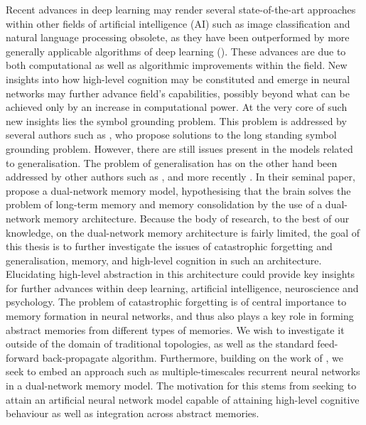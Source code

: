 Recent advances in deep learning may render several state-of-the-art approaches within other fields of artificial intelligence (AI) such as image classification and natural language processing obsolete, as they have been outperformed by more generally applicable algorithms of deep learning (\cite{LeCun2015, Schmidhuber2014}). These advances are due to both computational as well as algorithmic improvements within the field. New insights into how high-level cognition may be constituted and emerge in neural networks may further advance field's capabilities, possibly beyond what can be achieved only by an increase in computational power. At the very core of such new insights lies the symbol grounding problem. This problem is addressed by several authors such as \cite{Yamashita2008, Tani2014}, who propose solutions to the long standing symbol grounding problem. However, there are still issues present in the models related to generalisation. The problem of generalisation has on the other hand been addressed by other authors such as \cite{McClelland1995}, and more recently \cite{Hattori2014}. In their seminal paper, \cite{McClelland1995} propose a dual-network memory model, hypothesising that the brain solves the problem of long-term memory and memory consolidation by the use of a dual-network memory architecture. Because the body of research, to the best of our knowledge, on the dual-network memory architecture is fairly limited, the goal of this thesis is to further investigate the issues of catastrophic forgetting and generalisation, memory, and high-level cognition in such an architecture. Elucidating high-level abstraction in this architecture could provide key insights for further advances within deep learning, artificial intelligence, neuroscience and psychology. The problem of catastrophic forgetting is of central importance to memory formation in neural networks, and thus also plays a key role in forming abstract memories from different types of memories. We wish to investigate it outside of the domain of traditional topologies, as well as the standard feed-forward back-propagate algorithm. Furthermore, building on the work of \cite{Hattori2014}, we seek to embed an approach such as multiple-timescales recurrent neural networks in a dual-network memory model. The motivation for this stems from seeking to attain an artificial neural network model capable of attaining high-level cognitive behaviour as well as integration across abstract memories.

\cleardoublepage